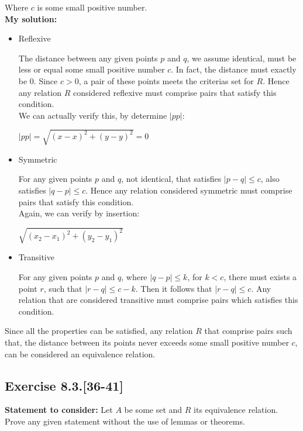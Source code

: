 \documentclass{report}
\newcommand{\cent}[1]{\begin{center}#1\end{center}}
\newcommand{\assignmentDescription}{\textbf{Statement to consider: }}
\newcommand{\solution}{\textbf{My solution: }}
\newcommand{\QED}{\boxed{}}
\newcommand{\Exercise}[1]{\subsection{Exercise #1}}
\begin{document}
	Where $c$ is some small positive number.\\
	
	\solution
	
	\begin{itemize}
		\item Reflexive
		
		The distance between any given points $p$ and $q$, we assume identical, must be less or equal some small positive number $c$. In fact, the distance must exactly be 0. Since $c > 0$, a pair of these points meets the criterias set for $R$. Hence any relation $R$ considered reflexive must comprise pairs that satisfy this condition.\\
		
		We can actually verify this, by determine $|pp|$:
		
		\cent{$ |pp| = \sqrt{(x - x)^2 + (y - y)^2} = 0 $}
		
		\item Symmetric
		
		For any given points $p$ and $q$, not identical, that satisfies $|p-q| \leq c$, also satisfies $|q-p| \leq c$. Hence any relation considered symmetric must comprise pairs that satisfy this condition.\\
		
		Again, we can verify by insertion:
		
		\cent{$\sqrt{(x_2 - x_1)^2 + (y_2 - y_1)^2}$}
		
		\item Transitive
		
		For any given points $p$ and $q$, where $|q-p| \leq k$, for $k < c$, there must exists a point $r$, such that $|r-q| \leq c - k$. Then it follows that $|r-q| \leq c$. Any relation that are considered transitive must comprise pairs which satisfies this condition.\\
	\end{itemize}
	
	Since all the properties can be satisfied, any relation $R$ that comprise pairs such that, the distance between its points never exceeds some small positive number $c$, can be considered an equivalence relation.\\
	\QED
	
	\Exercise{8.3.[36-41]}
	
	\assignmentDescription
	Let $A$ be some set and $R$ its equivalence relation.\\
	
	Prove any given statement without the use of lemmas or theorems.\\
	
\end{document}
